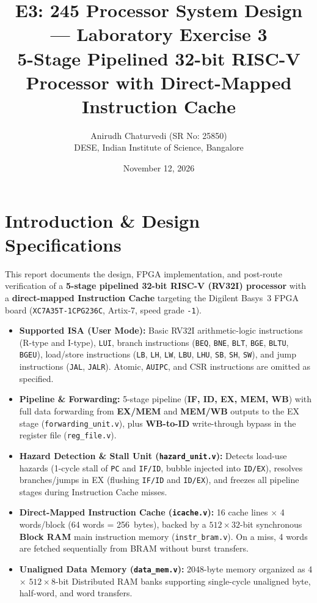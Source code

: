 \documentclass[11pt,a4paper]{article}
\title{\textbf{E3: 245 Processor System Design --- Laboratory Exercise 3}\\
\large 5-Stage Pipelined 32-bit RISC-V Processor with Direct-Mapped Instruction Cache}
\author{Anirudh Chaturvedi (SR No: 25850)\\DESE, Indian Institute of Science, Bangalore}
\date{November 12, 2026}
\begin{document}
\maketitle

\section{Introduction \& Design Specifications}
This report documents the design, FPGA implementation, and post-route verification of a \textbf{5-stage pipelined 32-bit RISC-V (RV32I) processor} with a \textbf{direct-mapped Instruction Cache} targeting the Digilent Basys~3 FPGA board (\texttt{XC7A35T-1CPG236C}, Artix-7, speed grade \texttt{-1}).

\begin{itemize}
    \item \textbf{Supported ISA (User Mode):} Basic RV32I arithmetic-logic instructions (R-type and I-type), \texttt{LUI}, branch instructions (\texttt{BEQ}, \texttt{BNE}, \texttt{BLT}, \texttt{BGE}, \texttt{BLTU}, \texttt{BGEU}), load/store instructions (\texttt{LB}, \texttt{LH}, \texttt{LW}, \texttt{LBU}, \texttt{LHU}, \texttt{SB}, \texttt{SH}, \texttt{SW}), and jump instructions (\texttt{JAL}, \texttt{JALR}). Atomic, \texttt{AUIPC}, and CSR instructions are omitted as specified.
    \item \textbf{Pipeline \& Forwarding:} 5-stage pipeline (\textbf{IF, ID, EX, MEM, WB}) with full data forwarding from \textbf{EX/MEM} and \textbf{MEM/WB} outputs to the EX stage (\texttt{forwarding\_unit.v}), plus \textbf{WB-to-ID} write-through bypass in the register file (\texttt{reg\_file.v}).
    \item \textbf{Hazard Detection \& Stall Unit (\texttt{hazard\_unit.v}):} Detects load-use hazards (1-cycle stall of \texttt{PC} and \texttt{IF/ID}, bubble injected into \texttt{ID/EX}), resolves branches/jumps in EX (flushing \texttt{IF/ID} and \texttt{ID/EX}), and freezes all pipeline stages during Instruction Cache misses.
    \item \textbf{Direct-Mapped Instruction Cache (\texttt{icache.v}):} 16 cache lines $\times$ 4 words/block (64 words = 256~bytes), backed by a $512 \times 32$-bit synchronous \textbf{Block RAM} main instruction memory (\texttt{instr\_bram.v}). On a miss, 4 words are fetched sequentially from BRAM without burst transfers.
    \item \textbf{Unaligned Data Memory (\texttt{data\_mem.v}):} 2048-byte memory organized as 4 $\times$ $512 \times 8$-bit Distributed RAM banks supporting single-cycle unaligned byte, half-word, and word transfers.
\end{itemize}
\end{document}
